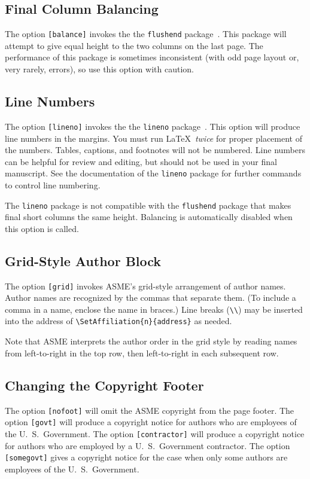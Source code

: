 \documentclass[captionpatch,colorlinks,upint,subscriptcorrection,varvw,german]{asmeconf}
\begin{document}
\subsection{Final Column Balancing} The option \texttt{[balance]} invokes the the \texttt{flushend} package~\cite{tolusis}.
This package will attempt to give equal height to the two columns on the last page. The performance of this package is sometimes inconsistent (with odd page layout or, very rarely, errors), so use this option with caution.

\subsection{Line Numbers} The option \texttt{[lineno]} invokes the the \texttt{lineno} package~\cite{bottcher}. This option will produce line numbers in the margins. You must run \LaTeX\ \textit{twice} for proper placement of the numbers. Tables, captions, and footnotes will not be numbered.  Line numbers can be helpful for review and editing, but should not be used in your final manuscript. See the documentation of the \texttt{lineno} package for further commands to control line numbering. 

The \texttt{lineno} package is not compatible with the \texttt{flushend} package that makes final short columns the same height. Balancing is automatically disabled when this option is called. 

\subsection{Grid-Style Author Block} The option \texttt{[grid]} invokes ASME's grid-style arrangement of author names. Author names are recognized by the commas that separate them. (To include a comma in a name, enclose the name in braces.) Line breaks (\verb|\\|) may be inserted into the address of \verb|\SetAffiliation{n}{address}| as needed. 

Note that ASME interprets the author order in the grid style by reading names from left-to-right in the top row, then left-to-right in each subsequent row.

\subsection{Changing the Copyright Footer} The option \texttt{[nofoot]} will omit the ASME copyright from the page footer. The option \texttt{[govt]} will produce a copyright notice for authors who are employees of the U.\ S.\ Government.  
The option \texttt{[contractor]} will produce a copyright
notice for authors who are employed by a U.\ S.\ Government contractor.
The option \texttt{[somegovt]} gives a copyright notice for the case when only some authors are employees of the U.\ S.\ Government.
\end{document}
